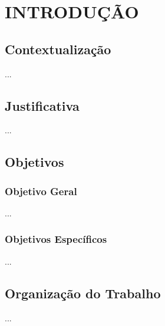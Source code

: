 \chapter{INTRODUÇÃO}
\label{chap:introducao}

\section{Contextualização}
...

\section{Justificativa}
...

\section{Objetivos}
\subsection{Objetivo Geral}
...

\subsection{Objetivos Específicos}
...

\section{Organização do Trabalho}
...